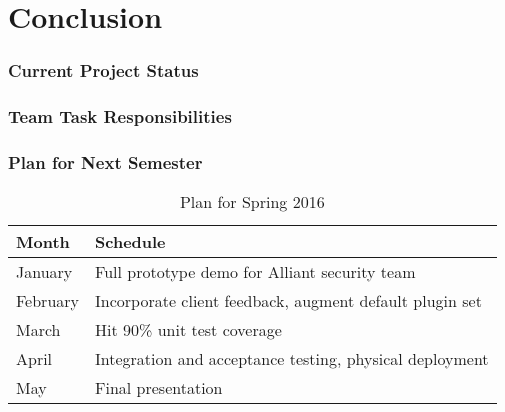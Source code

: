 \section{Conclusion}

\begin{frame}
\frametitle{Current Project Status}


\end{frame}

\begin{frame}
\frametitle{Team Task Responsibilities}


\end{frame}


\begin{frame}
\frametitle{Plan for Next Semester}

\begin{table}
\centering
\begin{tabularx}{\linewidth}{l | l}
\toprule
\textbf{Month} & \textbf{Schedule} \\
\midrule
January & Full prototype demo for Alliant security team \\
February & Incorporate client feedback, augment default plugin set \\
March & Hit 90\% unit test coverage \\
April & Integration and acceptance testing, physical deployment \\
May & Final presentation \\
\bottomrule
\end{tabularx}
\caption{Plan for Spring 2016}
\end{table}

\end{frame}
